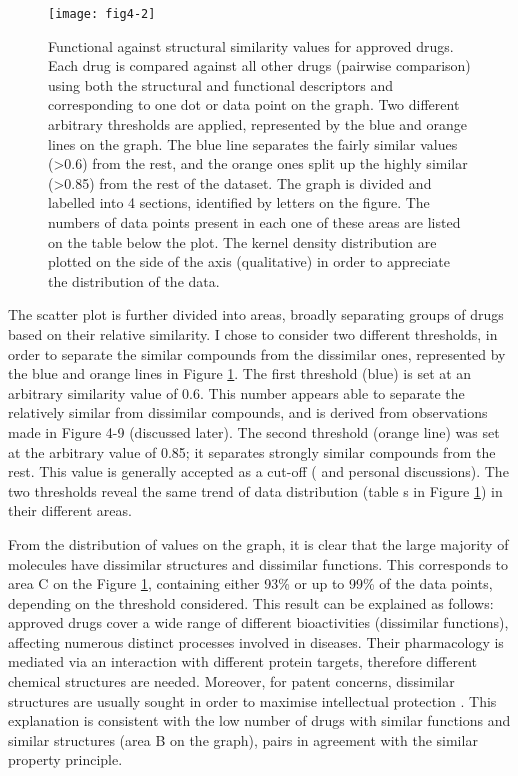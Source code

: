 \begin{figure}[H]
    \centering
    \texttt{[image: fig4-2]}
    \caption{Functional against structural similarity values for approved drugs. Each drug is compared against all other drugs (pairwise comparison) using both the structural and functional descriptors and corresponding to one dot or data point on the graph. Two different arbitrary thresholds are applied, represented by the blue and orange lines on the graph. The blue line separates the fairly similar values (\textgreater 0.6) from the rest, and the orange ones split up the highly similar (\textgreater 0.85) from the rest of the dataset. The graph is divided and labelled into 4 sections, identified by letters on the figure. The numbers of data points present in each one of these areas are listed on the table below the plot. The kernel density distribution are plotted on the side of the axis (qualitative) in order to appreciate the distribution of the data.}
    \label{fig4-2}
\end{figure}

The scatter plot is further divided into areas, broadly separating groups of drugs based on their relative similarity. I chose to consider two different thresholds, in order to separate the similar compounds from the dissimilar ones, represented by the blue and orange lines in Figure \ref{fig4-2}. The first threshold (blue) is set at an arbitrary similarity value of 0.6. This number appears able to separate the relatively similar from dissimilar compounds, and is derived from observations made in Figure 4-9 (discussed later). The second threshold (orange line) was set at the arbitrary value of 0.85; it separates strongly similar compounds from the rest. This value is generally accepted as a cut-off (\cite{chemsimwiki} and personal discussions). The two thresholds reveal the same trend of data distribution (table s in Figure \ref{fig4-2}) in their different areas.

From the distribution of values on the graph, it is clear that the large majority of molecules have dissimilar structures and dissimilar functions. This corresponds to area C on the Figure \ref{fig4-2}, containing either 93\% or up to 99\% of the data points, depending on the threshold considered. This result can be explained as follows: approved drugs cover a wide range of different bioactivities (dissimilar functions), affecting numerous distinct processes involved in diseases. Their pharmacology is mediated via an interaction with different protein targets, therefore different chemical structures are needed. Moreover, for patent concerns, dissimilar structures are usually sought in order to maximise intellectual protection \citep{barratt2012drug}. This explanation is consistent with the low number of drugs with similar functions and similar structures (area B on the graph), pairs in agreement with the similar property principle.

